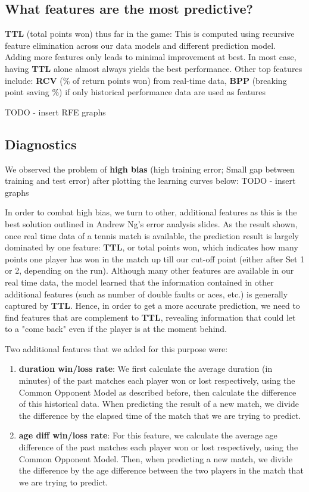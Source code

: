 \documentclass[paper=a4, fontsize=10pt]{scrartcl} %
\numberwithin{equation}{section} %
\numberwithin{figure}{section} %
\numberwithin{table}{section} %
\begin{document}
\subsection{What features are the most predictive?}
\textbf{TTL} (total points won) thus far in the game: This is computed using recursive feature elimination across our data models and different prediction model. Adding more features only leads to minimal improvement at best. In most case, having \textbf{TTL} alone almost always yields the best performance. Other top features include: \textbf{RCV} (\% of return points won) from real-time data, \textbf{BPP} (breaking point saving \%) if only historical performance data are used as features

TODO - insert RFE graphs

\subsection{Diagnostics}
We observed the problem of \textbf{high bias} (high training error; Small gap between training and test error) after plotting the learning curves below:
TODO - insert graphs

In order to combat high bias, we turn to other, additional features as this is the best solution outlined in Andrew Ng's error analysis slides. As the result shown, once real time data of a tennis match is available, the prediction result is largely dominated by one feature: \textbf{TTL}, or total points won, which indicates how many points one player has won in the match up till our cut-off point (either after Set 1 or 2, depending on the run). Although many other features are available in our real time data, the model learned that the information contained in other additional features (such as number of double faults or aces, etc.) is generally captured by \textbf{TTL}.  Hence, in order to get a more accurate prediction, we need to find features that are complement to \textbf{TTL}, revealing information that could let to a "come back" even if the player is at the moment behind.
 
Two additional features that we added for this purpose were: \begin{enumerate}
\item \textbf{duration win/loss rate}: We first calculate the average duration (in minutes) of the past matches each player won or lost respectively, using the Common Opponent Model as described before, then calculate the difference of this historical data. When predicting the result of a new match, we divide the difference by the elapsed time of the match that we are trying to predict. 
\item \textbf{age diff win/loss rate}: For this feature, we calculate the average age difference of the past matches each player won or lost respectively, using the Common Opponent Model. Then, when predicting a new match, we divide the difference by the age difference between the two players in the match that we are trying to predict.
\end{enumerate}
\end{document}
